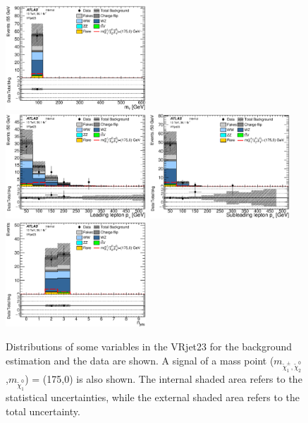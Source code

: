 \begin{figure}[htbp]
\includegraphics[width=0.47\textwidth]{data/plot/VR/all_Mt_VRjet23.eps} \\
\includegraphics[width=0.47\textwidth]{data/plot/VR/all_PtLep_VRjet23.eps}
\includegraphics[width=0.47\textwidth]{data/plot/VR/all_PtSublep_VRjet23.eps} \\
\includegraphics[width=0.47\textwidth]{data/plot/VR/all_Njets_VRjet23.eps}
\caption{Distributions of some variables in the VRjet23 for the background estimation and the data are shown. A signal of a mass point ($m_{\tilde{\chi}_1^\pm , \tilde{\chi}_2^0}$,$m_{\tilde{\chi}_1^0}$) = (175,0) is also shown. The internal shaded area refers to the statistical uncertainties, while the external shaded area refers to the total uncertainty.}
\label{fig:VRjet23_plot}
\end{figure}
